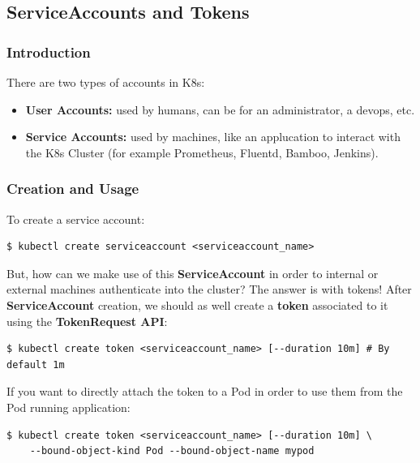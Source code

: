 \documentclass{article}
\newenvironment{codetemplate}[1][]{%
  \mybasecolorbox[#1]
  \itshape
}{%
  \endmybasecolorbox
}
\begin{document}
\subsection{ServiceAccounts and Tokens}
\subsubsection{Introduction}
There are two types of accounts in K8s:
\begin{itemize}
    \item \textbf{User Accounts:} used by humans, can be for an administrator, a devops, etc.
    \item \textbf{Service Accounts:} used by machines, like an applucation to interact with the K8s Cluster (for example Prometheus, Fluentd, Bamboo, Jenkins).
\end{itemize}

\subsubsection{Creation and Usage}
To create a service account:
\begin{codetemplate}{}
\begin{verbatim}
$ kubectl create serviceaccount <serviceaccount_name>
\end{verbatim}
\end{codetemplate}

But, how can we make use of this \textbf{ServiceAccount} in order to internal or external machines authenticate into the cluster? The answer is with tokens!
After \textbf{ServiceAccount} creation, we should as well create a \textbf{token} associated to it using the \textbf{TokenRequest API}:
\begin{codetemplate}{}
\begin{verbatim}
$ kubectl create token <serviceaccount_name> [--duration 10m] # By default 1m
\end{verbatim}
\end{codetemplate}

If you want to directly attach the token to a Pod in order to use them from the Pod running application:
\begin{codetemplate}{}
\begin{verbatim}
$ kubectl create token <serviceaccount_name> [--duration 10m] \
    --bound-object-kind Pod --bound-object-name mypod
\end{verbatim}
\end{codetemplate}
\end{document}
